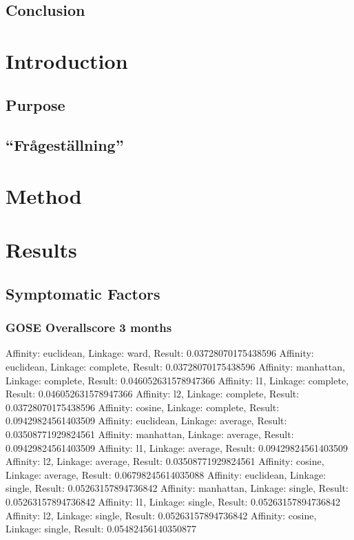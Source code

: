 \documentclass[11pt]{article}
\begin{document}
\subsection*{Conclusion}

\tableofcontents

\section{Introduction}

\subsection{Purpose}

\subsection{``Frågeställning''}

\section{Method}

\section{Results}
\subsection{Symptomatic Factors}
\subsubsection{GOSE Overallscore 3 months}
Affinity: euclidean, Linkage: ward,      Result: 0.03728070175438596
Affinity: euclidean, Linkage: complete,  Result: 0.03728070175438596
Affinity: manhattan, Linkage: complete,  Result: 0.046052631578947366
Affinity: l1,        Linkage: complete,  Result: 0.046052631578947366
Affinity: l2,        Linkage: complete,  Result: 0.03728070175438596
Affinity: cosine,    Linkage: complete,  Result: 0.09429824561403509
Affinity: euclidean, Linkage: average,   Result: 0.03508771929824561
Affinity: manhattan, Linkage: average,   Result: 0.09429824561403509
Affinity: l1,        Linkage: average,   Result: 0.09429824561403509
Affinity: l2,        Linkage: average,   Result: 0.03508771929824561
Affinity: cosine,    Linkage: average,   Result: 0.06798245614035088
Affinity: euclidean, Linkage: single,    Result: 0.05263157894736842
Affinity: manhattan, Linkage: single,    Result: 0.05263157894736842
Affinity: l1,        Linkage: single,    Result: 0.05263157894736842
Affinity: l2,        Linkage: single,    Result: 0.05263157894736842
Affinity: cosine,    Linkage: single,    Result: 0.05482456140350877
\end{document}
